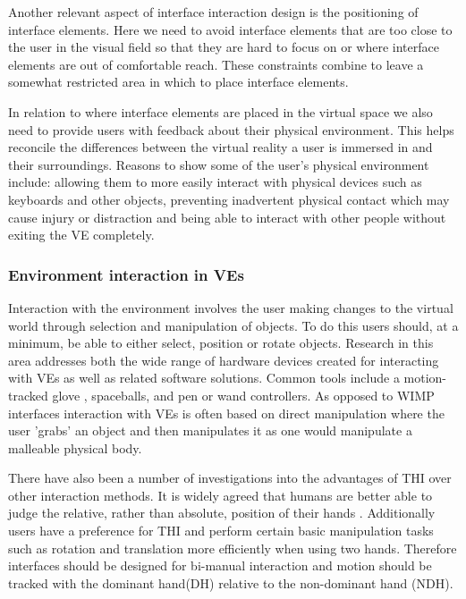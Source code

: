 \documentclass{sig-alternate-05-2015}
\begin{document}
 Another relevant aspect of interface interaction design is the positioning of interface elements.\cite{alger2015visual} Here we need to avoid interface elements that are too close to the user in the visual field so that they are hard to focus on or where interface elements are out of comfortable reach. These constraints combine to leave a somewhat restricted area in which to place interface elements.
 
In relation to where interface elements are placed in the virtual space we also need to provide users with feedback about their physical environment. This helps reconcile the differences between the virtual reality a user is immersed in and their surroundings\cite{Duval2014}. Reasons to show some of the user's physical environment include: allowing them to more easily interact with physical devices such as keyboards and other objects, preventing inadvertent physical contact which may cause injury or distraction and being able to interact with other people without exiting the VE completely.
 
\subsubsection{Environment interaction in VEs}
 Interaction with the environment involves the user making changes to the virtual world through selection and manipulation of objects. To do this users should, at a minimum, be able to either select, position or rotate objects\cite{Bowman2001}. Research in this area addresses both the wide range of hardware devices created for interacting with VEs as well as related software solutions. Common tools include a motion-tracked glove \cite{Zimmerman1986}, spaceballs\cite{Hand1997}, and pen or wand controllers\cite{Schultheis2012}. As opposed to WIMP interfaces interaction with VEs is often based on direct manipulation where the user 'grabs' an object and then manipulates it as one would manipulate a malleable physical body.
  
 There have also been a number of investigations into the advantages of THI over other interaction methods. It is widely agreed that humans are better able to judge the relative, rather than absolute, position of their hands \cite{Bowman1998, Buxton1986}. Additionally users have a preference for THI\cite{Buxton1986} and perform certain basic manipulation tasks such as rotation and translation more efficiently when using two hands\cite{Schultheis2012,Balakrishnan1999}. Therefore interfaces should be designed for bi-manual interaction and motion should be tracked with the dominant hand(DH) relative to the non-dominant hand (NDH)\cite{Hinckley1994}.
 
\end{document}
